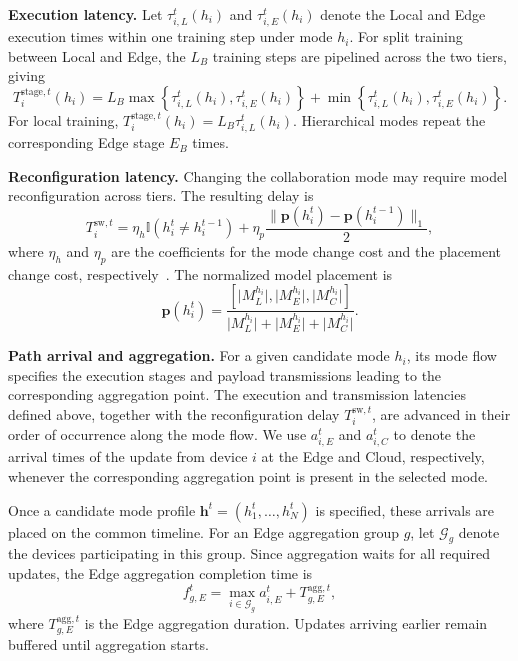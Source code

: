 \documentclass[5p,times]{elsarticle}
\theoremstyle{plain}
\theoremstyle{definition}
\theoremstyle{remark}
\begin{document}
\textbf{Execution latency.}
Let \(\tau_{i,L}^t(h_i)\) and \(\tau_{i,E}^t(h_i)\) denote the Local and Edge execution times within one training step under mode \(h_i\). For split training between Local and Edge, the \(L_B\) training steps are pipelined across the two tiers, giving
\begin{equation}
T_i^{\mathrm{stage},t}(h_i)
=
L_B\max\!\left\{
\tau_{i,L}^t(h_i),\tau_{i,E}^t(h_i)
\right\}
+
\min\!\left\{
\tau_{i,L}^t(h_i),\tau_{i,E}^t(h_i)
\right\}.
\label{eq:execution_latency}
\end{equation}
For local training, \(T_i^{\mathrm{stage},t}(h_i)=L_B\tau_{i,L}^t(h_i)\). Hierarchical modes repeat the corresponding Edge stage \(E_B\) times.

\textbf{Reconfiguration latency.}
Changing the collaboration mode may require model reconfiguration across tiers. The resulting delay is
\begin{equation}
T_i^{\mathrm{sw},t}
=
\eta_h \mathbb{I}(h_i^t\neq h_i^{t-1})
+
\eta_p
\frac{
\|\mathbf{p}(h_i^t)-\mathbf{p}(h_i^{t-1})\|_1
}{2},
\label{eq:switching_cost}
\end{equation}
where \(\eta_h\) and \(\eta_p\) are the coefficients for the mode change cost and the placement change cost, respectively~\cite{CHEN2026112204,li2026latency}. The normalized model placement is
\begin{equation}
\mathbf{p}(h_i^t)
=
\frac{
\left[
\lvert M_L^{h_i}\rvert,
\lvert M_E^{h_i}\rvert,
\lvert M_C^{h_i}\rvert
\right]
}{
\lvert M_L^{h_i}\rvert+
\lvert M_E^{h_i}\rvert+
\lvert M_C^{h_i}\rvert
}.
\label{eq:model_placement_vector}
\end{equation}

\textbf{Path arrival and aggregation.}
For a given candidate mode \(h_i\), its mode flow specifies the execution stages and payload transmissions leading to the corresponding aggregation point. The execution and transmission latencies defined above, together with the reconfiguration delay \(T_i^{\mathrm{sw},t}\), are advanced in their order of occurrence along the mode flow. We use \(a_{i,E}^t\) and \(a_{i,C}^t\) to denote the arrival times of the update from device \(i\) at the Edge and Cloud, respectively, whenever the corresponding aggregation point is present in the selected mode.

Once a candidate mode profile \(\mathbf h^t=(h_1^t,\ldots,h_N^t)\) is specified, these arrivals are placed on the common timeline. For an Edge aggregation group \(g\), let \(\mathcal G_g\) denote the devices participating in this group. Since aggregation waits for all required updates, the Edge aggregation completion time is
\begin{equation}
f_{g,E}^t
=
\max_{i\in\mathcal G_g} a_{i,E}^t
+
T_{g,E}^{\mathrm{agg},t},
\label{eq:edge_agg_finish}
\end{equation}
where \(T_{g,E}^{\mathrm{agg},t}\) is the Edge aggregation duration. Updates arriving earlier remain buffered until aggregation starts.
\end{document}
